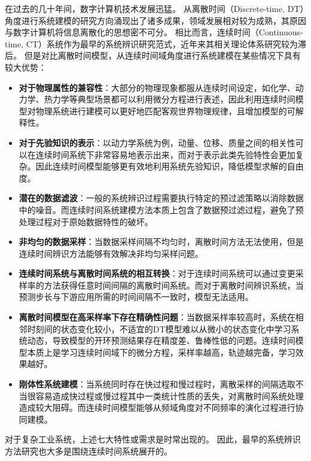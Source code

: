 在过去的几十年间，数字计算机技术发展迅猛。
从离散时间（Discrete-time, DT）角度进行系统建模的研究方向涌现出了诸多成果，领域发展相对较为成熟，其原因与数字计算机将信息离散化的思想密不可分。
相比而言，连续时间（Continuous-time, CT）系统作为最早的系统辨识研究范式，近年来其相关理论体系研究较为滞后。
但是对比离散时间模型，从连续时间域角度进行系统建模在某些情况下具有较大优势：
\begin{itemize}
\setlength{\itemsep}{0pt}
\setlength{\parsep}{0pt}
\setlength{\parskip}{0pt}
\setlength{\topsep}{0pt}
\setlength{\partopsep}{0pt}
\item	\textbf{对于物理属性的兼容性}：大部分的物理现象都服从连续时间设定，如化学、动力学、热力学等典型场景都可以利用微分方程进行表述，因此利用连续时间模型对物理系统进行建模可以更好地匹配客观世界物理规律，且增加模型的可解释性。
\item	\textbf{对于先验知识的表示}：以动力学系统为例，动量、位移、质量之间的相关性可以在连续时间系统下非常容易地表示出来，而对于表示此类先验特性会更加复杂。因此连续时间模型能够更有效地利用系统先验知识，降低模型求解的自由度。
\item \textbf{潜在的数据滤波}：一般的系统辨识过程需要执行特定的预过滤策略以消除数据中的噪音。而连续时间系统建模方法本质上包含了数据预过滤过程，避免了预处理过程对于原始数据特性的破坏。
\item \textbf{非均匀的数据采样}：当数据采样间隔不均匀时，离散时间方法无法使用，但是连续时间辨识方法能够有效解决非均匀采样问题。
\item \textbf{连续时间系统与离散时间系统的相互转换}：对于连续时间系统可以通过变更采样率的方法获得任意时间间隔的离散时间系统。而对于离散时间辨识系统，当预测步长与下游应用所需的时间间隔不一致时，模型无法适用。
\item \textbf{离散时间模型在高采样率下存在精确性问题}：当数据采样率较高时，系统在相邻时刻间的状态变化较小，不适宜的DT模型难以从微小的状态变化中学习系统动态，导致模型的开环预测结果存在精度差、鲁棒性低的问题。连续时间模型本质上是学习连续时间域下的微分方程，采样率越高，轨迹越完备，学习效果越好。
\item \textbf{刚体性系统建模}：当系统同时存在快过程和慢过程时，离散采样的间隔选取不当很容易造成快过程或慢过程其中一类统计性质的丢失，对离散时间系统处理造成较大阻碍。而连续时间模型能够从频域角度对不同频率的演化过程进行协同建模。
\end{itemize}
对于复杂工业系统，上述七大特性或需求是时常出现的。
因此，最早的系统辨识方法研究也大多是围绕连续时间系统展开的。
